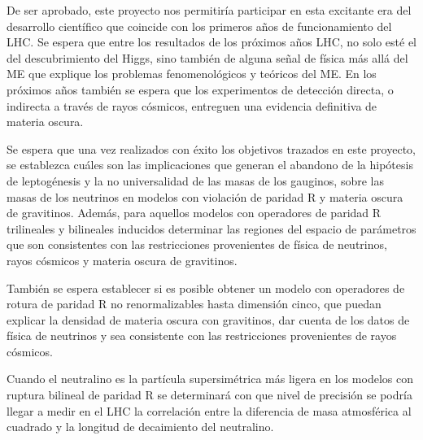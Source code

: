 De ser aprobado, este proyecto nos permitiría participar en esta
excitante era del desarrollo científico que coincide con
los primeros años de funcionamiento del LHC.  Se espera que entre los
resultados de los próximos años LHC, no solo esté el del
descubrimiento del Higgs, sino también de alguna señal de física más
allá del ME que explique los problemas fenomenológicos y
teóricos del ME. En los próximos años también se espera
que los experimentos de detección directa, o indirecta a través de
rayos cósmicos, entreguen una evidencia definitiva de materia oscura.


\begin{gravitinodm}
  Se espera que una vez realizados con éxito los objetivos trazados en
  este proyecto, se establezca cuáles son las implicaciones que
  generan el abandono de la hipótesis de leptogénesis y la no
  universalidad de las masas de los gauginos, sobre las masas de los
  neutrinos en modelos con violación de paridad R y materia oscura de
  gravitinos. Además, para aquellos modelos con operadores de paridad R trilineales
  y bilineales inducidos determinar las regiones del espacio de
  parámetros que son consistentes con las restricciones provenientes
  de física de neutrinos, rayos cósmicos y materia oscura de gravitinos. 
\end{gravitinodm}

\begin{bbrpvlhc}
  También se espera establecer si es posible obtener un modelo con 
  operadores de rotura de paridad R no renormalizables hasta dimensión cinco, que puedan
  explicar la densidad de materia oscura con gravitinos, dar cuenta de
  los datos de física de neutrinos y sea consistente con las
  restricciones provenientes de rayos cósmicos.
\end{bbrpvlhc}

\begin{brpvlhc}
  Cuando el neutralino es la partícula supersimétrica más ligera en los modelos con ruptura bilineal de paridad R se determinará con que nivel de precisión se podría llegar a medir en el LHC la correlación entre la diferencia de masa atmosférica al cuadrado y la longitud de decaimiento del neutralino.
\end{brpvlhc}

